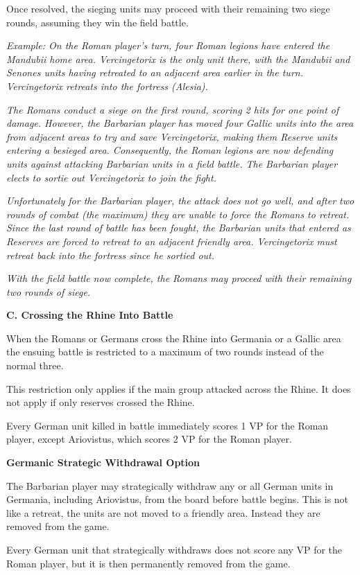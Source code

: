 Once resolved, the sieging units may proceed with their remaining two siege rounds, assuming they win the field battle.

\textit{Example: On the Roman player's turn, four Roman legions have entered the Mandubii home area. Vercingetorix is the only unit there, with the Mandubii and Senones units having retreated to an adjacent area earlier in the turn. Vercingetorix retreats into the fortress (Alesia).}

\textit{The Romans conduct a siege on the first round, scoring 2 hits for one point of damage. However, the Barbarian player has moved four Gallic units into the area from adjacent areas to try and save Vercingetorix, making them Reserve units entering a besieged area. Consequently, the Roman legions are now defending units against attacking Barbarian units in a field battle. The Barbarian player elects to sortie out Vercingetorix to join the fight.}

\textit{Unfortunately for the Barbarian player, the attack does not go well, and after two rounds of combat (the maximum) they are unable to force the Romans to retreat. Since the last round of battle has been fought, the Barbarian units that entered as Reserves are forced to retreat to an adjacent friendly area. Vercingetorix must retreat back into the fortress since he sortied out.}

\textit{With the field battle now complete, the Romans may proceed with their remaining two rounds of siege.}

\textbf{C. Crossing the Rhine Into Battle}
\par
When the Romans or Germans cross the Rhine into Germania or a Gallic area the ensuing battle is restricted to a maximum of two rounds instead of the normal three.

This restriction only applies if the main group attacked across the Rhine. It does not apply if only reserves crossed the Rhine.

Every German unit killed in battle immediately scores 1 VP for the Roman player, except Ariovistus, which scores 2 VP for the Roman player.

\textbf{Germanic Strategic Withdrawal Option}
\par
The Barbarian player may strategically withdraw any or all German units in Germania, including Ariovistus, from the board before battle begins. This is not like a retreat, the units are not moved to a friendly area. Instead they are removed from the game.

Every German unit that strategically withdraws does not score any VP for the Roman player, but it is then permanently removed from the game.

